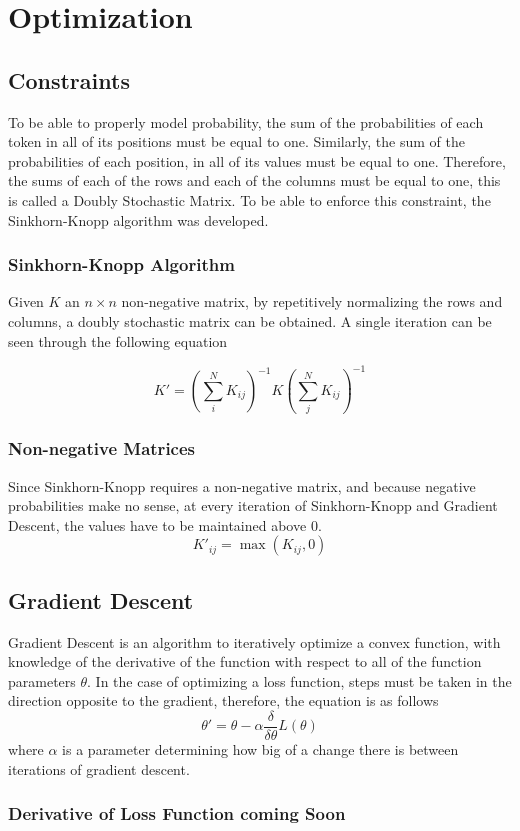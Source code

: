 \section{Optimization}%
\label{sec:optimization}

\subsection{Constraints}%
\label{sub:constraints}
To be able to properly model probability, the sum of the probabilities of each token in all of its positions must be equal to one. Similarly, the sum of the probabilities of each position, in all of its values must be equal to one. Therefore, the sums of each of the rows and each of the columns must be equal to one, this is called a Doubly Stochastic Matrix. To be able to enforce this constraint, the Sinkhorn-Knopp algorithm was developed.

\subsubsection{Sinkhorn-Knopp Algorithm}%
\label{ssub:sinkhorn_knopp_algorithm}

Given $K$ an $n\times n$ non-negative matrix, by repetitively normalizing the rows and columns, a doubly stochastic matrix can be obtained. A single iteration can be seen through the following equation

\begin{equation}
        K'=\left(\sum^N_i K_{ij}\right)^{-1}K\left(\sum^N_j K_{ij}\right)^{-1}
\end{equation}

\subsubsection{Non-negative Matrices}%
\label{ssub:non_negative_matrices}
Since Sinkhorn-Knopp requires a non-negative matrix, and because negative probabilities make no sense, at every iteration of Sinkhorn-Knopp and Gradient Descent, the values have to be maintained above $0$.
\begin{equation}
        K'_{ij}=\max(K_{ij},0)
\end{equation}

\subsection{Gradient Descent}%
\label{sub:gradient_descent}
Gradient Descent is an algorithm to iteratively optimize a convex function, with knowledge of the derivative of the function with respect to all of the function parameters $\theta$. In the case of optimizing a loss function, steps must be taken in the direction opposite to the gradient, therefore, the equation is as follows
\begin{equation}
         \theta'=\theta-\alpha \frac{\delta}{\delta \theta}L(\theta)
\end{equation}
where $\alpha$ is a parameter determining how big of a change there is between iterations of gradient descent.

\subsubsection{Derivative of Loss Function coming Soon}%
\label{ssub:derivative_of_loss_function_coming_soon}


